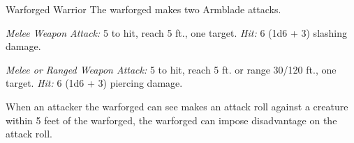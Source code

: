 \documentclass[10pt,a4paper,twoside,bg=print,twocolumn,openany,nodeprecatedcode]{dndbook}
\begin{document}
\begin{DndMonster}[float=t]{Warforged Warrior}
\DndMonsterBasics[
armor-class = {16 (natural armor)},
hit-points = {\DndDice{4d8 + 12}},
speed = {30 ft.}
]
\DndMonsterAbilityScores[
 str = 16,
 dex = 12,
 con = 16,
 int = 10,
 wis = 14,
 cha = 11
]
\DndMonsterDetails[
skills = {Athletics +5, Perception +4, Survival +4},
damage-resistances = {poison},
condition-immunities = {poisoned},
languages = {Common},
challenge = 1,
]
The warforged makes two Armblade attacks.

\textsl{Melee Weapon Attack:} 5 to hit, reach 5 ft., one target. \textsl{Hit:} 6 (1d6 + 3) slashing damage.

\textsl{Melee or Ranged Weapon Attack:} 5 to hit, reach 5 ft. or range 30/120 ft., one target. \textsl{Hit:} 6 (1d6 + 3) piercing damage.

When an attacker the warforged can see makes an attack roll against a creature within 5 feet of the warforged, the warforged can impose disadvantage on the attack roll.

\end{DndMonster}
\end{document}
